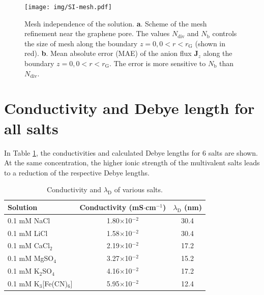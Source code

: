 \documentclass[manuscript=suppinfo,email=true, hyperref=true, keywords=false]{achemso}
\begin{document}
\begin{figure}[htbp]
  \centering
  \texttt{[image: img/SI-mesh.pdf]}
  \caption{Mesh independence of the solution. \textbf{a}. Scheme of
    the mesh refinement near the graphene pore. The values
    $N_{\mathrm{div}}$ and $N_{\mathrm{b}}$ controls the size of mesh
    along the boundary $z=0, 0<r<r_{\mathrm{G}}$ (shown in
    red). \textbf{b}. Mean absolute error (MAE) of the anion flux
    $\boldsymbol{J}_{z}$ along the boundary $z=0,
    0<r<r_{\mathrm{G}}$. The error is more sensitive to
    $N_{\mathrm{b}}$ than $N_{\mathrm{div}}$.}
  \label{fig:mesh}
\end{figure}

\section{Conductivity and Debye length for all salts}
\label{sec:salts}
In Table \ref{tab:conductivity}, the conductivities and calculated Debye
lengths for 6 salts are shown. At the same concentration, the higher
ionic strength of the multivalent salts leads to a reduction of the
respective Debye lengths.

\begin{table}[htbp]
  \centering
  \begin{tabular}{lcc}
    \hline
    Solution & Conductivity (mS$\cdot$cm$^{-1}$) & $\lambda_{\mathrm{D}}$ (nm) \\
    \hline
    0.1 mM NaCl &1.80$\times$10$^{-2}$  &30.4\\
    0.1 mM LiCl &1.58$\times$10$^{-2}$ &30.4\\
    0.1 mM CaCl$_{2}$&  2.19$\times$10$^{-2}$ &17.2\\
    0.1 mM MgSO$_{4}$   &3.27$\times$10$^{-2}$ &15.2\\
    0.1 mM K$_{2}$SO$_{4}$      &4.16$\times$10$^{-2}$ &17.2\\
    0.1 mM K$_{3}$[Fe(CN)$_{6}$]&       5.95$\times$10$^{-2}$  &12.4\\
    \hline
  \end{tabular}
  \caption{Conductivity and $\lambda_{\mathrm{D}}$ of various salts.}
  \label{tab:conductivity}
\end{table}


\section*{}
\label{sec:ref}

\end{document}

